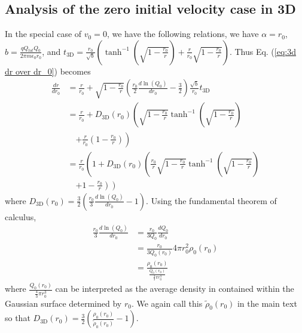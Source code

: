 \documentclass[aps,prl,twocolumn,showpacs,superscriptaddress,groupedaddress]{revtex4-1}  %
\begin{document}
\subsection{Analysis of the zero initial velocity case in 3D}
In the special case of $v_0 = 0$, we have the following relations, we have $\alpha = r_0$, $b = \frac{q Q_{tot} Q_0}{2 \pi m \epsilon_0 r_0}$, and $t_\text{3D} = \frac{r_0}{\sqrt{b}} \left( \tanh^{-1} \left( \sqrt{1 -  \frac{r_0}{r}} \right) + \frac{r}{r_0}\sqrt{1 -  \frac{r_0}{r}}\right)$.  Thus Eq. (\ref{eq:3d dr over dr_0})
becomes
\begin{align}
  \frac{d r}{d r_0} &= \frac{r}{r_0} + \sqrt{1 - \frac{r_0}{r}} \left( \frac{r_0}{2} \frac{d \ln(Q_0)}{d r_0} - \frac{3}{2}\right)\frac{\sqrt{b}}{r_0} t_\text{3D}\nonumber\\
                           &= \frac{r}{r_0} + D_\text{3D}(r_0)  \left( \sqrt{1 -  \frac{r_0}{r}} \tanh^{-1} \left( \sqrt{1 -  \frac{r_0}{r}} \right)\right.\nonumber\\
                           &\quad\left. + \frac{r}{r_0}\left(1 -  \frac{r_0}{r}\right)\right)\nonumber\\
                           &= \frac{r}{r_0} \left( 1 + D_\text{3D}(r_0) \left( \frac{r_0}{r} \sqrt{1 -  \frac{r_0}{r}} \tanh^{-1} \left( \sqrt{1 -  \frac{r_0}{r}} \right)\right.\right.\nonumber\\
                           &\quad\left.\left. + 1 -  \frac{r_0}{r}\right)\right)\label{eq:3d dr over dr_0 no v_0}
\end{align}
where $D_\text{3D}(r_0) = \frac{3}{2}\left(\frac{r_0}{3} \frac{d\ln(Q_0)}{d r_0} - 1\right)$.  Using the fundamental theorem of calculus,
\begin{align}
  \frac{r_0}{3} \frac{d\ln(Q_0)}{d r_0} &= \frac{r_0}{3 Q_0}\frac{dQ_0}{d r_0} \nonumber\\ 
                                                                    &= \frac{r_0}{3 Q_0(r_0)} 4 \pi r_0^2 \rho_0(r_0)\nonumber\\
                                                                    &= \frac{\rho_0(r_0)}{\frac{Q_0(r_0)}{\frac{4}{3}\pi r_0^3}} 
\end{align}
where $\frac{Q_0(r_0)}{\frac{4}{3}\pi r_0^3}$ can be interpreted as the average density in contained within the Gaussian surface determined by $r_0$.
We again call this 
$\tilde{\rho}_0(r_0)$ in the main text so that $D_\text{3D}(r_0) = \frac{3}{2}\left(\frac{\rho_0(r_0)}{\tilde{\rho}_0(r_0)} -1\right)$.
\end{document}
